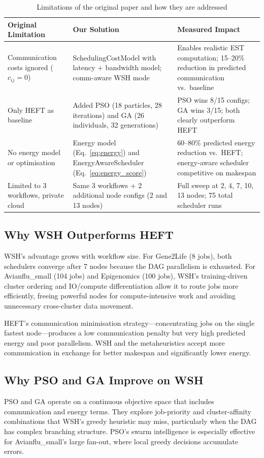 \documentclass[12pt,a4paper]{article}
\begin{document}
\begin{table}[H]
\centering
\caption{Limitations of the original paper and how they are addressed}
\label{tab:contributions}
\begin{tabular}{@{}p{5cm}p{5cm}p{3.5cm}@{}}
\toprule
\textbf{Original Limitation} & \textbf{Our Solution} & \textbf{Measured Impact} \\
\midrule
Communication costs ignored ($c_{ij}=0$) & SchedulingCostModel with latency + bandwidth model; comm-aware WSH mode & Enables realistic EST computation; 15--20\% reduction in predicted communication vs.\ baseline \\
\midrule
Only HEFT as baseline & Added PSO (18 particles, 28 iterations) and GA (26 individuals, 32 generations) & PSO wins 8/15 configs; GA wins 3/15; both clearly outperform HEFT \\
\midrule
No energy model or optimisation & Energy model (Eq.~\ref{eq:energy}) and EnergyAwareScheduler (Eq.~\ref{eq:energy_score}) & 60--80\% predicted energy reduction vs.\ HEFT; energy-aware scheduler competitive on makespan \\
\midrule
Limited to 3 workflows, private cloud & Same 3 workflows + 2 additional node configs (2 and 13 nodes) & Full sweep at 2, 4, 7, 10, 13 nodes; 75 total scheduler runs \\
\bottomrule
\end{tabular}
\end{table}

\subsection{Why WSH Outperforms HEFT}
WSH's advantage grows with workflow size. For Gene2Life (8 jobs), both schedulers converge after 7 nodes because the DAG parallelism is exhausted. For Avianflu\_small (104 jobs) and Epigenomics (100 jobs), WSH's training-driven cluster ordering and IO/compute differentiation allow it to route jobs more efficiently, freeing powerful nodes for compute-intensive work and avoiding unnecessary cross-cluster data movement.

HEFT's communication minimisation strategy---concentrating jobs on the single fastest node---produces a low communication penalty but very high predicted energy and poor parallelism. WSH and the metaheuristics accept more communication in exchange for better makespan and significantly lower energy.

\subsection{Why PSO and GA Improve on WSH}
PSO and GA operate on a continuous objective space that includes communication and energy terms. They explore job-priority and cluster-affinity combinations that WSH's greedy heuristic may miss, particularly when the DAG has complex branching structure. PSO's swarm intelligence is especially effective for Avianflu\_small's large fan-out, where local greedy decisions accumulate errors.
\end{document}
